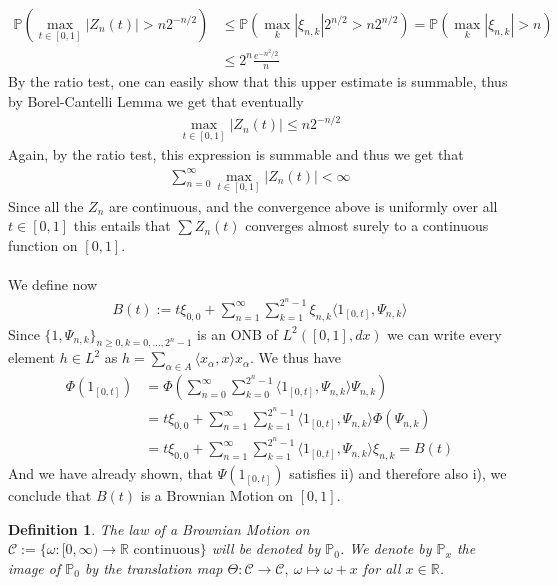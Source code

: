 \documentclass[11pt,a4paper, final]{article}
\newtheorem{defn}{Definition}[section]
\theoremstyle{definition}
\begin{document}
\begin{align*}
\mathbb{P}( \max_{t \in [0,1]}| Z_n(t) | > n 2^{-n/2} ) &\leq  \mathbb{P}( \max_k | \xi_{n,k} | 2^{n/2} > n 2^{n/2} )  = \mathbb{P}( \max_{k} | \xi_{n,k} | >n )  \\
& \leq 2^n \frac{e ^{-n^2/2}}{n}
\end{align*}
By the ratio test, one can easily show that this upper estimate is summable, thus by Borel-Cantelli Lemma we get that eventually 
\begin{align*}
\max_{t \in [0,1]} |Z_n(t) | \leq n 2^{-n/2}
\end{align*}
Again, by the ratio test, this expression is summable and thus we get that 
\begin{align*}
\sum_{n=0}^\infty \max_{t \in [0,1]}  | Z_n(t)| < \infty 
\end{align*}
Since all the $Z_n$ are continuous, and the convergence above is uniformly over all $t \in [0,1]$ this entails that $\sum Z_n(t)$ converges almost surely to a continuous function on $[0,1]$. 
\\\\
We define now 
\begin{align*}
B(t):= t \xi_{0,0} + \sum_{n=1}^\infty  \sum_{k=1}^{2^n-1} \xi_{n,k} \langle 1_{[0,t]}, \Psi_{n,k} \rangle 
\end{align*}
Since $\lbrace 1, \Psi_{n,k} \rbrace_{n \geq 0, k =0, \dots , 2^n-1}$ is an ONB of $L^2([0,1], dx)$ we can write every element $h \in L^2$ as $h = \sum_{ \alpha \in A } \langle x_\alpha, x \rangle x_\alpha.$ We thus have
\begin{align*}
\Phi( 1_{[0,t]}) &= \Phi \left( \sum_{n=0}^\infty \sum_{k=0}^{2^n-1} \langle 1_{[0,t]}, \Psi_{n,k} \rangle \Psi_{n,k}  \right) \\
& = t \xi_{0,0} + \sum_{n=1}^\infty \sum_{k=1}^{2^n-1} \langle 1_{[0,t]}, \Psi_{n,k} \rangle \Phi \left( \Psi_{n,k} \right) \\
& = t \xi_{0,0} + \sum_{n=1}^\infty \sum_{k=1}^{2^n-1} \langle 1_{[0,t]}, \Psi_{n,k} \rangle \xi_{n,k}  = B(t)
\end{align*}
And we have already shown, that $\Psi(1_{[0,t]})$ satisfies ii) and therefore also i), we conclude that $B(t)$ is a Brownian Motion on $[0,1]$. 
\newpage
\begin{defn} The law of a Brownian Motion on $\mathcal{C}:= \lbrace \omega : [0, \infty) \to \mathbb{R} \text{ continuous} \rbrace$ will be denoted by $\mathbb{P}_0$. We denote by $\mathbb{P}_x$ the image of $\mathbb{P}_0$ by the translation map $\Theta: \mathcal{C} \to \mathcal{C}, \ \omega \mapsto \omega + x$ for all $x \in \mathbb{R}$.
\end{defn}
\end{document}
